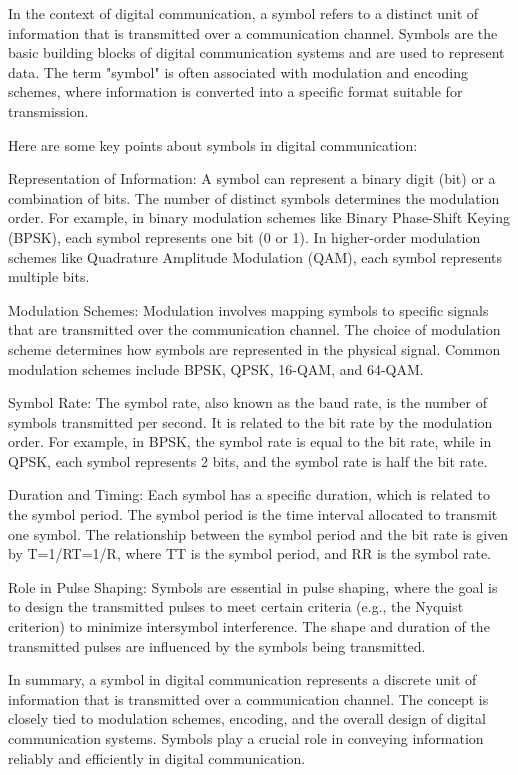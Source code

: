 \documentclass[../../../../DMCC-My-Notebook]{subfiles}
\begin{document}
			
			
			
			
			
			
			
			In the context of digital communication, a symbol refers to a distinct unit of information that is transmitted over a communication channel. Symbols are the basic building blocks of digital communication systems and are used to represent data. The term "symbol" is often associated with modulation and encoding schemes, where information is converted into a specific format suitable for transmission.
			
			Here are some key points about symbols in digital communication:
			
			Representation of Information: A symbol can represent a binary digit (bit) or a combination of bits. The number of distinct symbols determines the modulation order. For example, in binary modulation schemes like Binary Phase-Shift Keying (BPSK), each symbol represents one bit (0 or 1). In higher-order modulation schemes like Quadrature Amplitude Modulation (QAM), each symbol represents multiple bits.
			
			Modulation Schemes: Modulation involves mapping symbols to specific signals that are transmitted over the communication channel. The choice of modulation scheme determines how symbols are represented in the physical signal. Common modulation schemes include BPSK, QPSK, 16-QAM, and 64-QAM.
			
			Symbol Rate: The symbol rate, also known as the baud rate, is the number of symbols transmitted per second. It is related to the bit rate by the modulation order. For example, in BPSK, the symbol rate is equal to the bit rate, while in QPSK, each symbol represents 2 bits, and the symbol rate is half the bit rate.
			
			Duration and Timing: Each symbol has a specific duration, which is related to the symbol period. The symbol period is the time interval allocated to transmit one symbol. The relationship between the symbol period and the bit rate is given by T=1/RT=1/R, where TT is the symbol period, and RR is the symbol rate.
			
			Role in Pulse Shaping: Symbols are essential in pulse shaping, where the goal is to design the transmitted pulses to meet certain criteria (e.g., the Nyquist criterion) to minimize intersymbol interference. The shape and duration of the transmitted pulses are influenced by the symbols being transmitted.
			
			In summary, a symbol in digital communication represents a discrete unit of information that is transmitted over a communication channel. The concept is closely tied to modulation schemes, encoding, and the overall design of digital communication systems. Symbols play a crucial role in conveying information reliably and efficiently in digital communication.
	
\end{document}
